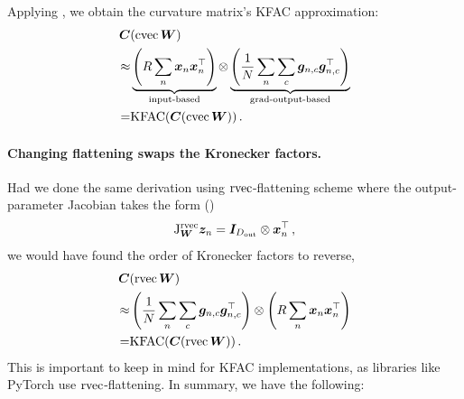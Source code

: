 Applying , we obtain the curvature matrix's KFAC approximation:
\begin{align*}
  {\bm{C}}&(\operatorname{cvec} {\bm{W}}) \\
  \approx&
           \underbrace{\left( R \sum_n {\bm{x}}_n {\bm{x}}_n^{\top} \right)}_{\text{input-based}}
           \otimes
           \underbrace{\left( \frac{1}{N} \sum_n \sum_c {\bm{g}}_{n,c} {\bm{g}}_{n,c}^{\top} \right)}_{\text{grad-output-based}}
  \\
  =& \mathrm{KFAC}({\bm{C}}(\operatorname{cvec} {\bm{W}}))\,.
\end{align*}

\paragraph{Changing flattening swaps the Kronecker factors.}
Had we done the same derivation using $\operatorname{rvec}$-flattening scheme where the output-parameter Jacobian takes the form ()
$$ \mathrm{J}^{\operatorname{rvec}}_{{\bm{W}}}{\bm{z}}_n = {\bm{I}}_{D_{\text{out}}} \otimes {\bm{x}}_n^{\top}\,,$$
we would have found the order of Kronecker factors to reverse,
\begin{align*}
  {\bm{C}}&(\operatorname{rvec} {\bm{W}}) \\
  \approx&
           \left( \frac{1}{N} \sum_n \sum_c {\bm{g}}_{n,c} {\bm{g}}_{n,c}^{\top} \right)
           \otimes
           \left( R \sum_n {\bm{x}}_n {\bm{x}}_n^{\top} \right)
  \\
  =& \mathrm{KFAC}({\bm{C}}(\operatorname{rvec} {\bm{W}}))\,.
\end{align*}
This is important to keep in mind for KFAC implementations, as libraries like PyTorch use $\operatorname{rvec}$-flattening.
In summary, we have the following:

\switchcolumn[1]
\switchcolumn[0]

